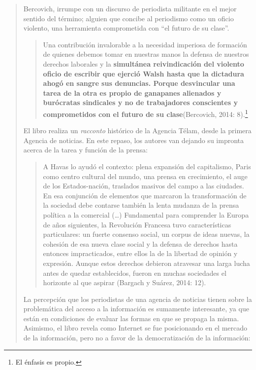 \begin{quote}
Bercovich, irrumpe con un discurso de periodista militante en el mejor sentido del término; alguien que concibe al periodismo como un oficio violento, una herramienta comprometida con \enquote{el futuro de su clase}.

\begin{quote}
	Una contribución invalorable a la necesidad imperiosa de formación de quienes debemos tomar en nuestras manos la defensa de nuestros derechos laborales y la \textbf{simultánea reivindicación del violento oficio de escribir que ejerció Walsh hasta que la dictadura ahogó en sangre sus denuncias. Porque desvincular una tarea de la otra es propio de ganapanes alienados y burócratas sindicales y no de trabajadores conscientes y comprometidos con el futuro de su clase}(Bercovich, 2014: 8).\footnote{El énfasis es propio.}
\end{quote}


El libro realiza un \emph{racconto} histórico de la Agencia Télam, desde la primera Agencia de noticias. En este repaso, los autores van dejando su impronta acerca de la tarea y función de la prensa:

\begin{quote}
	A Havas lo ayudó el contexto: plena expansión del capitalismo, Paris como centro cultural del mundo, una prensa en crecimiento, el auge de los Estados-nación, traslados masivos del campo a las ciudades. En esa conjunción de elementos que marcaron la transformación de la sociedad debe contarse también la lenta mudanza de la prensa política a la comercial (\dots) Fundamental para comprender la Europa  de años siguientes, la Revolución Francesa tuvo características particulares: un fuerte consenso social, un corpus de ideas nuevas, la cohesión de esa nueva clase social y la defensa de derechos hasta entonces impracticados, entre ellos la de la libertad de opinión y expresión. Aunque estos derechos debieron atravesar una larga lucha antes de quedar establecidos, fueron en muchas sociedades el horizonte al que aspirar (Bargach y Suárez, 2014: 12).
\end{quote}


La percepción que los periodistas de una agencia de noticias tienen sobre la problemática del acceso a la información es sumamente interesante, ya que están en condiciones de evaluar las formas en que se propaga la misma. Asimismo, el libro revela como Internet se fue posicionando en el mercado de la información, pero no a favor  de la democratización de la información:


\end{quote}
